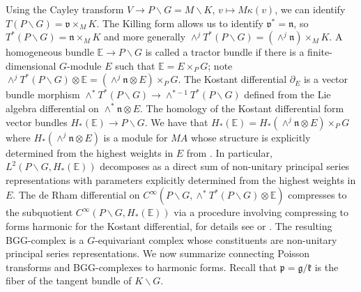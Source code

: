\documentclass[a4paper,reqno]{amsart}
\numberwithin{equation}{section}
\theoremstyle{definition}
\theoremstyle{remark}
\begin{document}
Using the Cayley transform $V\to P\backslash G=M\backslash K$, $v\mapsto M\kappa(v)$, we can identify $T(P\backslash G)=\mathfrak{v}\times_M K$. The Killing form allows us to identify $\mathfrak{v}^*=\mathfrak{n}$, so $T^*(P\backslash G)=\mathfrak{n}\times_M K$ and more generally $\wedge^j T^*(P\backslash G)=(\wedge^j\mathfrak{n})\times_M K$. A homogeneous bundle $\mathbb{E}\to P\backslash G$ is called a tractor bundle if  there is a finite-dimensional $G$-module $E$ such that $\mathbb{E}=E\times_P G$; note $\wedge^j T^*(P\backslash G)\otimes\mathbb{E} =(\wedge^j\mathfrak{n}\otimes E)\times_P G$. The Kostant differential $\partial_E$ is a vector bundle morphism  $\wedge^* T^*(P\backslash G)\to \wedge^{*-1} T^*(P\backslash G)$ defined from the Lie algebra differential on $\wedge^*\mathfrak{n}\otimes E$. The homology of the Kostant differential form vector bundles $H_*(\mathbb{E})\to P\backslash G$. We have that $H_*(\mathbb{E})=H_*(\wedge^j\mathfrak{n}\otimes E)\times_P G$ where $H_*(\wedge^j\mathfrak{n}\otimes E)$ is a module for $MA$ whose structure is explicitly determined from the highest weights in $E$ from \cite[Theorem 3.3.5 and Proposition 3.3.6]{cap}. In particular, $L^2(P\backslash G,H_*(\mathbb{E}))$ decomposes as a direct sum of non-unitary principal series representations with parameters explicitly determined from the highest weights in $E$. The de Rham differential on $C^\infty(P\backslash G,\wedge^*T^*(P\backslash G)\otimes\mathbb{E})$ compresses to the subquotient $C^\infty(P\backslash G,H_*(\mathbb{E}))$ via a procedure involving compressing to forms harmonic for the Kostant differential, for details see \cite{Dave_Haller1} or \cite{morecap,goffbgg}. The resulting BGG-complex is a $G$-equivariant complex whose constituents are non-unitary principal series representations. We now summarize \cite[Proposition 2.2]{capjulg} connecting Poisson transforms and BGG-complexes to harmonic forms. Recall that $\mathfrak{p}=\mathfrak{g}/\mathfrak{k}$ is the fiber of the tangent bundle of $K\backslash G$.
\end{document}
